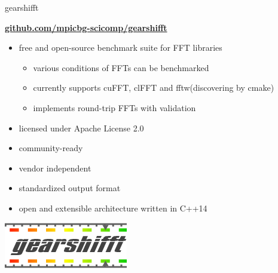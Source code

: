 \documentclass[t,11pt,hyperref={
  pdftitle = {gearshifft},
  pdfsubject = {gearshifft},
  pdfborder={0 0 0},
  colorlinks=true,
  urlcolor=red,
  citecolor=red,
  linkcolor=red,
  pdfauthor={Peter Steinbach, Matthias Werner}
  }
]{beamer}
\begin{document}
\begin{frame}{gearshifft}

\vfill
      \begin{center}\Large
        \href{https://github.com/mpicbg-scicomp/gearshifft}{\textbf{github.com/mpicbg-scicomp/gearshifft}}
      \end{center}

\vfill
  \begin{itemize}
  \item free and open-source benchmark suite for FFT libraries
    \begin{itemize}
    \item various conditions of FFTs can be benchmarked
    \item currently supports cuFFT, clFFT and fftw\newline (discovering by cmake)
    \item implements round-trip FFTs with validation
    \end{itemize}
  \item licensed under Apache License 2.0
  \item community-ready
  \item vendor independent 
  \item standardized output format
  \item open and extensible architecture written in C++14
  \end{itemize}
\vfill
\pause
\begin{center}
  \includegraphics[width=.4\textwidth]{gearshifft_logo_img_100.png}
\end{center}

\vfill
\end{frame}
\end{document}
